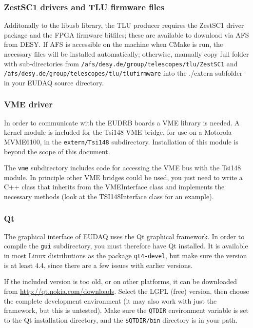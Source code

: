 \subsubsection{ZestSC1 drivers and TLU firmware files}
Additonally to the libusb library, the \gls{TLU} producer requires the
ZestSC1 driver package and the FPGA firmware bitfiles; these are
available to download via AFS from DESY. If AFS is accessible on the machine
when CMake is run, the necessary files will be installed
automatically; otherwise, manually copy full folder with
sub-directories from
\texttt{/afs/desy.de/group/telescopes/tlu/ZestSC1} and
\texttt{/afs/desy.de/group/telescopes/tlu/tlufirmware} into the
./extern subfolder in your EUDAQ source directory.


\subsubsection{VME driver}
In order to communicate with the \gls{EUDRB} boards a VME library is needed.
A kernel module is included for the Tsi148 VME bridge,
for use on a Motorola MVME6100, in the \texttt{extern/Tsi148} subdirectory.
Installation of this module is beyond the scope of this document.

The \texttt{vme} subdirectory includes code for accessing the VME bus with the Tsi148 module.
In principle other VME bridges could be used,
you just need to write a C++ class that inherits from the VMEInterface class
and implements the necessary methods (look at the TSI148Interface class for an example).

\subsubsection{Qt}
The graphical interface of EUDAQ uses the Qt graphical framework.
In order to compile the \texttt{gui} subdirectory, you must therefore have Qt installed.
It is available in most Linux distributions as the package \texttt{qt4-devel},
but make sure the version is at least 4.4, since there are a few issues with earlier versions.

If the included version is too old, or on other platforms,
it can be downloaded from \url{http://qt.nokia.com/downloads}.
Select the LGPL (free) version, then choose the complete development environment
(it may also work with just the framework, but this is untested).
Make sure the \texttt{QTDIR} environment variable is set to the Qt installation directory,
and the \texttt{\$QTDIR/bin} directory is in your path.

